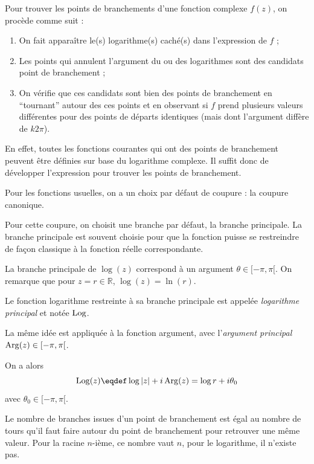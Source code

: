 \begin{myrem}
	Pour trouver les points de branchements d'une fonction complexe
	$f(z)$, on procède comme suit :
	\begin{enumerate}
		\item On fait apparaître le(s) logarithme(s) caché(s) dans
		l'expression de $f$ ;
		\item	Les points qui annulent l'argument du ou des logarithmes
		sont des candidats point de branchement ;
		\item On vérifie que ces candidats sont bien des points
		de branchement en ``tournant'' autour des ces points
		et en observant si $f$ prend plusieurs valeurs différentes
		pour des points de départs identiques (mais dont l'argument
		diffère de $k2\pi$).
	\end{enumerate}
	En effet, toutes les fonctions courantes qui ont des points
	de branchement peuvent être définies sur base du logarithme complexe.
	Il suffit donc de développer l'expression pour trouver les points
	de branchement.
\end{myrem}

\begin{mydef}
    Pour les fonctions usuelles, on a un choix par défaut
    de coupure : la coupure canonique.
    
    Pour cette coupure, on choisit une branche par défaut,
    la branche principale. La branche principale est souvent choisie
    pour que la fonction puisse se restreindre de façon classique à la
    fonction réelle correspondante.
\end{mydef}

\begin{myrem}
    La branche principale de $\log(z)$ correspond à un argument
    $\theta\in [-\pi, \pi[$. On remarque que pour $z = r \in \mathbb{R}$,
    $\log(z) = \ln(r)$.
    
    Le fonction logarithme restreinte à sa branche principale est
    appelée \emph{logarithme principal} et notée $\operatorname{Log}$.
    
    La même idée est appliquée à la fonction argument, 
    avec l'\emph{argument principal} $\operatorname{Arg}(z) \in [-\pi, \pi[$.
    
    On a alors 
    \[\Log(z) \eqdef \log|z| + i\Arg(z) = \log r + i\theta_0\]
    avec $\theta_0 \in [-\pi,\pi[$.
\end{myrem}

Le nombre de branches issues d'un point de branchement est égal au
nombre de tours qu'il faut faire autour du point de branchement pour
retrouver une même valeur. Pour la racine $n$-ième, ce nombre vaut $n$,
pour le logarithme, il n'existe pas.


